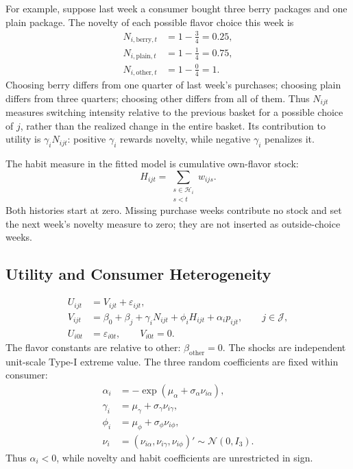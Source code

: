 \documentclass[12pt]{article}
\theoremstyle{definition}
\theoremstyle{remark}
\begin{document}
For example, suppose last week a consumer bought three berry packages and one
plain package. The novelty of each possible flavor choice this week is
\begin{equation}
 \begin{aligned}
 N_{i,\mathrm{berry},t}&=1-\frac{3}{4}=0.25,\\
 N_{i,\mathrm{plain},t}&=1-\frac{1}{4}=0.75,\\
 N_{i,\mathrm{other},t}&=1-\frac{0}{4}=1.
 \end{aligned}
 \label{eq:novelty-example}
\end{equation}
Choosing berry differs from one quarter of last week's purchases; choosing
plain differs from three quarters; choosing other differs from all of them.
Thus $N_{ijt}$ measures switching intensity relative to the previous basket
for a possible choice of $j$, rather than the realized change in the entire
basket. Its contribution to utility is $\gamma_iN_{ijt}$: positive $\gamma_i$
rewards novelty, while negative $\gamma_i$ penalizes it.


The habit measure in the fitted model is cumulative own-flavor stock:
\begin{equation}
 H_{ijt}=\sum_{\substack{s\in\mathcal H_i\\s<t}}w_{ijs}.
 \label{eq:empirical-habit}
\end{equation}
Both histories start at zero. Missing purchase weeks contribute no stock and
set the next week's novelty measure to zero; they are not inserted as outside-choice weeks.

\subsection{Utility and Consumer Heterogeneity}
\begin{align}
 U_{ijt}&=V_{ijt}+\varepsilon_{ijt},\\
 V_{ijt}&=\beta_0+\beta_j+\gamma_iN_{ijt}+\phi_iH_{ijt}+\alpha_i p_{ijt},
 \qquad j\in\mathcal J,
 \label{eq:utility}\\
 U_{i0t}&=\varepsilon_{i0t},\qquad V_{i0t}=0.
\end{align}
The flavor constants are relative to other: $\beta_{\mathrm{other}}=0$.
The shocks are independent unit-scale Type-I extreme value.
The three random coefficients are fixed within consumer:
\begin{align}
 \alpha_i&=-\exp(\mu_\alpha+\sigma_\alpha\nu_{i\alpha}),\\
 \gamma_i&=\mu_\gamma+\sigma_\gamma\nu_{i\gamma},\\
 \phi_i&=\mu_\phi+\sigma_\phi\nu_{i\phi},\\
 \nu_i&=(\nu_{i\alpha},\nu_{i\gamma},\nu_{i\phi})'
 \sim\mathcal N(0,I_3).
\end{align}
Thus $\alpha_i<0$, while novelty and habit coefficients are unrestricted in sign.
\end{document}
